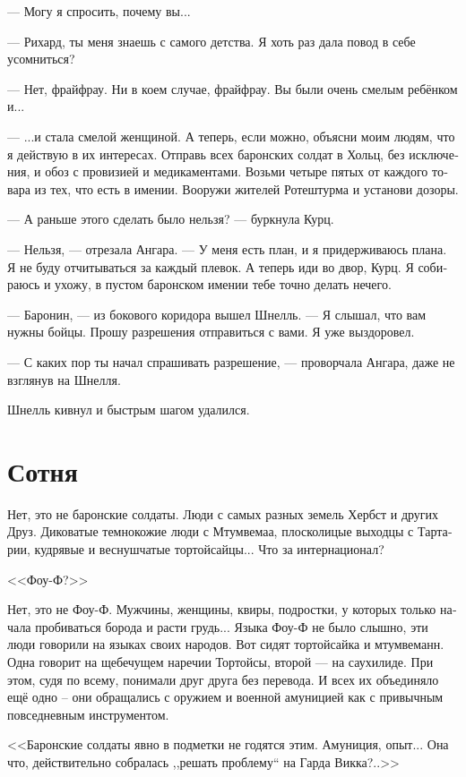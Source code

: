 \documentclass[a4paper,12pt,fleqn]{book}\usepackage{polyglossia}\setdefaultlanguage[babelshorthands=true]{russian}\setotherlanguage{english}\defaultfontfeatures{Ligatures=TeX,Mapping=tex-text}\usepackage{xcolor}\newcommand{\ml}[3]{#2}
\begin{document}
--- Могу я спросить, почему вы...

--- Рихард, ты меня знаешь с самого детства.
Я хоть раз дала повод в себе усомниться?

--- Нет, фрайфрау.
Ни в коем случае, фрайфрау.
Вы были очень смелым ребёнком и...

--- ...и стала смелой женщиной.
А теперь, если можно, объясни моим людям, что я действую в их интересах.
Отправь всех баронских солдат в Хольц, без исключения, и обоз с провизией и медикаментами.
Возьми четыре пятых от каждого товара из тех, что есть в имении.
Вооружи жителей Ротештурма и установи дозоры.

--- А раньше этого сделать было нельзя? --- буркнула Курц.

--- Нельзя, --- отрезала Ангара.
--- У меня есть план, и я придерживаюсь плана.
Я не буду отчитываться за каждый плевок.
А теперь иди во двор, Курц.
Я собираюсь и ухожу, в пустом баронском имении тебе точно делать нечего.

--- Баронин, --- из бокового коридора вышел Шнелль.
--- Я слышал, что вам нужны бойцы.
Прошу разрешения отправиться с вами.
Я уже выздоровел.

--- С каких пор ты начал спрашивать разрешение, --- проворчала Ангара, даже не взглянув на Шнелля.

Шнелль кивнул и быстрым шагом удалился.

\section{Сотня}

Нет, это не баронские солдаты.
Люди с самых разных земель Хербст и других Друз.
Диковатые темнокожие люди с Мтумвемаа, плосколицые выходцы с Тартарии, кудрявые и веснушчатые тортойсайцы...
Что за интернационал?

<<Фоу-Ф?>>

Нет, это не Фоу-Ф.
Мужчины, женщины, квиры, подростки, у которых только начала пробиваться борода и расти грудь...
Языка Фоу-Ф не было слышно, эти люди говорили на языках своих народов.
Вот сидят тортойсайка и мтумвеманн.
Одна говорит на щебечущем наречии Тортойсы, второй --- на саухилиде.
При этом, судя по всему, понимали друг друга без перевода.
И всех их объединяло ещё одно -- они обращались с оружием и военной амуницией как с привычным повседневным инструментом.

<<Баронские солдаты явно в подметки не годятся этим.
Амуниция, опыт...
Она что, действительно собралась ,,решать проблему`` на Гарда Викка?..>>
\end{document}
